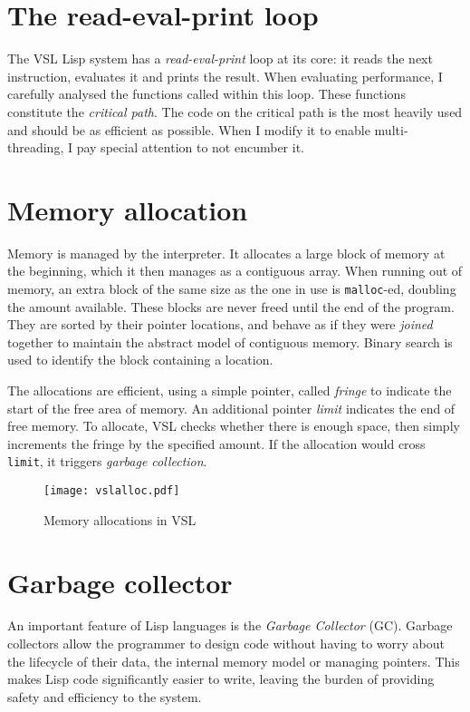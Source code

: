 \section{The read-eval-print loop}

The VSL Lisp system has a \emph{read-eval-print} loop at its core: it reads the next instruction, evaluates
it and prints the result. When evaluating performance, I carefully analysed the functions
called within this loop. These functions constitute the \emph{critical path}. The code on the critical
path is the most heavily used and should be as efficient as possible. When I modify it to enable
multi-threading, I pay special attention to not encumber it.

\section{Memory allocation}
Memory is managed by the interpreter. It allocates a large block of memory at the beginning,
which it then manages as a contiguous array. When running out of memory, an extra block of the
same size as the one in use is \verb|malloc|-ed, doubling the amount available. These blocks are
never freed until the end of the program. They are sorted by their pointer locations,
and behave as if they were \emph{joined} together to maintain the abstract model of contiguous memory.
Binary search is used to identify the block containing a location.

The allocations are efficient, using a simple pointer, called \emph{fringe} to indicate the start of the
free area of memory. An additional pointer \emph{limit} indicates the end of free memory. To allocate,
VSL checks whether there is enough space, then simply increments the fringe by the specified amount.
If the allocation would cross \verb|limit|, it triggers \emph{garbage collection}.

\begin{figure}[H]
    \centering
    \texttt{[image: vslalloc.pdf]}
    \label{fig:vslalloc}
    \caption{Memory allocations in VSL}
\end{figure}

\section{Garbage collector}
An important feature of Lisp languages is the \emph{Garbage Collector} (GC). Garbage collectors allow the programmer
to design code without having to worry about the lifecycle of their data, the internal memory model or
managing pointers. This makes Lisp code significantly easier to write, leaving the burden of providing safety and
efficiency to the system.

